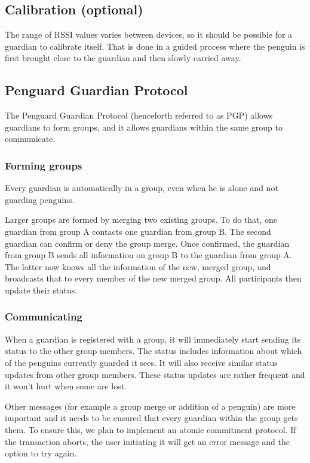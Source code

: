 \documentclass{report}
\begin{document}
\subsection{Calibration (optional)}

The range of RSSI values varies between devices, so it should be possible for a guardian to calibrate itself. That is done in a guided process where the penguin is first brought close to the guardian and then slowly carried away.

\subsection{Penguard Guardian Protocol}

The Penguard Guardian Protocol (henceforth referred to as PGP) allows guardians to form groups, and it allows guardians within the same group to communicate.

\subsubsection{Forming groups}

Every guardian is automatically in a group, even when he is alone and not guarding penguins.

Larger groups are formed by merging two existing groups. To do that, one guardian from group A contacts one guardian from group B. The second guardian can confirm or deny the group merge. Once confirmed, the guardian from group B sends all information on group B to the guardian from group A. The latter now knows all the information of the new, merged group, and broadcasts that to every member of the new merged group. All participants then update their status.

\subsubsection{Communicating}

When a guardian is registered with a group, it will immediately start sending its status to the other group members. The status includes information about which of the penguins currently guarded it sees. It will also receive similar status updates from other group members. These status updates are rather frequent and it won't hurt when some are lost.

Other messages (for example a group merge or addition of a penguin) are more important and it needs to be ensured that every guardian within the group gets them. To ensure this, we plan to implement an atomic commitment protocol. If the transaction aborts, the user initiating it will get an error message and the option to try again.
\end{document}
